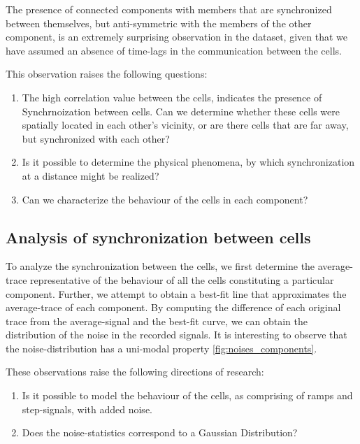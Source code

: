 \documentclass[10pt]{article}
\begin{document}
The presence of connected components with members that are synchronized between themselves, but anti-symmetric with the members of the other component, is an extremely surprising observation in the dataset, given that we have assumed an absence of time-lags in the communication between the cells. 

This observation raises the following questions:
\begin{enumerate}
\item The high correlation value between the cells, indicates the presence of Synchrnoization between cells. Can we determine whether these cells were spatially located in each other's vicinity, or are there cells that are far away, but synchronized with each other?
\item Is it possible to determine the physical phenomena, by which synchronization at a distance might be realized?
\item Can we characterize the behaviour of the cells in each component? 
\end{enumerate}

\subsection{Analysis of synchronization between cells}
To analyze the synchronization between the cells, we first determine the average-trace representative of the behaviour of all the cells constituting a particular component. Further, we attempt to obtain a best-fit line that approximates the average-trace of each component. By computing the difference of each original trace from the average-signal and the best-fit curve, we can obtain the distribution of the noise in the recorded signals. It is interesting to observe that the noise-distribution has a uni-modal property \ref{fig:noises_components}.

These observations raise the following directions of research:
\begin{enumerate}
\item Is it possible to model the behaviour of the cells, as comprising of ramps and step-signals, with added noise.
\item Does the noise-statistics correspond to a Gaussian Distribution?
\end{enumerate}
\end{document}

